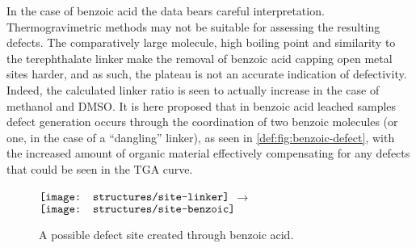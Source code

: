 In the case of benzoic acid the data bears careful interpretation. 
Thermogravimetric methods may not be suitable 
for assessing the resulting defects. The comparatively large molecule,
high boiling point and similarity to the terephthalate linker
make the removal of benzoic acid capping open metal sites harder, and
as such, the plateau is not an accurate indication of defectivity.
Indeed, the calculated linker ratio is seen to actually increase in 
the case of methanol and \gls{DMSO}. It is here proposed that in benzoic acid 
leached samples defect generation occurs through the coordination
of two benzoic molecules (or one, in the case of a ``dangling'' linker), 
as seen in \autoref{def:fig:benzoic-defect},
with the increased amount of organic material effectively compensating
for any defects that could be seen in the \gls{TGA} curve.

\begin{figure}[htb]
    \centering
    \( \vcenter{\hbox{\texttt{[image: structures/site-linker]}}}\)%
    \( \longrightarrow \)%
    \(\vcenter{\hbox{\texttt{[image: structures/site-benzoic]}}}\)
		\caption{A possible defect site created through benzoic acid.
		}\label{def:fig:benzoic-defect}
\end{figure}


